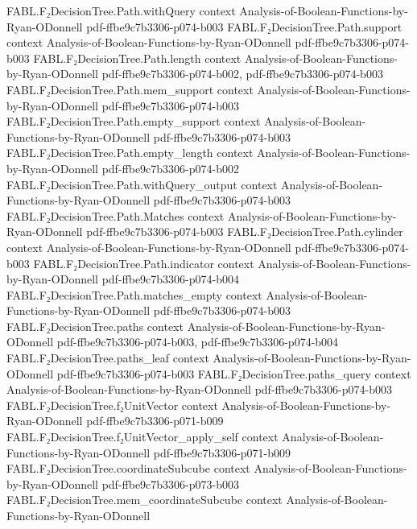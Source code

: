 \begin{theorem}
\proofstep
  {FABL.F₂DecisionTree.Path.withQuery}
  {context}
  {Analysis-of-Boolean-Functions-by-Ryan-ODonnell}
  {pdf-ffbe9c7b3306-p074-b003}
\proofstep
  {FABL.F₂DecisionTree.Path.support}
  {context}
  {Analysis-of-Boolean-Functions-by-Ryan-ODonnell}
  {pdf-ffbe9c7b3306-p074-b003}
\proofstep
  {FABL.F₂DecisionTree.Path.length}
  {context}
  {Analysis-of-Boolean-Functions-by-Ryan-ODonnell}
  {pdf-ffbe9c7b3306-p074-b002,
    pdf-ffbe9c7b3306-p074-b003}
\proofstep
  {FABL.F₂DecisionTree.Path.mem_support}
  {context}
  {Analysis-of-Boolean-Functions-by-Ryan-ODonnell}
  {pdf-ffbe9c7b3306-p074-b003}
\proofstep
  {FABL.F₂DecisionTree.Path.empty_support}
  {context}
  {Analysis-of-Boolean-Functions-by-Ryan-ODonnell}
  {pdf-ffbe9c7b3306-p074-b003}
\proofstep
  {FABL.F₂DecisionTree.Path.empty_length}
  {context}
  {Analysis-of-Boolean-Functions-by-Ryan-ODonnell}
  {pdf-ffbe9c7b3306-p074-b002}
\proofstep
  {FABL.F₂DecisionTree.Path.withQuery_output}
  {context}
  {Analysis-of-Boolean-Functions-by-Ryan-ODonnell}
  {pdf-ffbe9c7b3306-p074-b003}
\proofstep
  {FABL.F₂DecisionTree.Path.Matches}
  {context}
  {Analysis-of-Boolean-Functions-by-Ryan-ODonnell}
  {pdf-ffbe9c7b3306-p074-b003}
\proofstep
  {FABL.F₂DecisionTree.Path.cylinder}
  {context}
  {Analysis-of-Boolean-Functions-by-Ryan-ODonnell}
  {pdf-ffbe9c7b3306-p074-b003}
\proofstep
  {FABL.F₂DecisionTree.Path.indicator}
  {context}
  {Analysis-of-Boolean-Functions-by-Ryan-ODonnell}
  {pdf-ffbe9c7b3306-p074-b004}
\proofstep
  {FABL.F₂DecisionTree.Path.matches_empty}
  {context}
  {Analysis-of-Boolean-Functions-by-Ryan-ODonnell}
  {pdf-ffbe9c7b3306-p074-b003}
\proofstep
  {FABL.F₂DecisionTree.paths}
  {context}
  {Analysis-of-Boolean-Functions-by-Ryan-ODonnell}
  {pdf-ffbe9c7b3306-p074-b003,
    pdf-ffbe9c7b3306-p074-b004}
\proofstep
  {FABL.F₂DecisionTree.paths_leaf}
  {context}
  {Analysis-of-Boolean-Functions-by-Ryan-ODonnell}
  {pdf-ffbe9c7b3306-p074-b003}
\proofstep
  {FABL.F₂DecisionTree.paths_query}
  {context}
  {Analysis-of-Boolean-Functions-by-Ryan-ODonnell}
  {pdf-ffbe9c7b3306-p074-b003}
\proofstep
  {FABL.F₂DecisionTree.f₂UnitVector}
  {context}
  {Analysis-of-Boolean-Functions-by-Ryan-ODonnell}
  {pdf-ffbe9c7b3306-p071-b009}
\proofstep
  {FABL.F₂DecisionTree.f₂UnitVector_apply_self}
  {context}
  {Analysis-of-Boolean-Functions-by-Ryan-ODonnell}
  {pdf-ffbe9c7b3306-p071-b009}
\proofstep
  {FABL.F₂DecisionTree.coordinateSubcube}
  {context}
  {Analysis-of-Boolean-Functions-by-Ryan-ODonnell}
  {pdf-ffbe9c7b3306-p073-b003}
\proofstep
  {FABL.F₂DecisionTree.mem_coordinateSubcube}
  {context}
  {Analysis-of-Boolean-Functions-by-Ryan-ODonnell}

\end{theorem}
